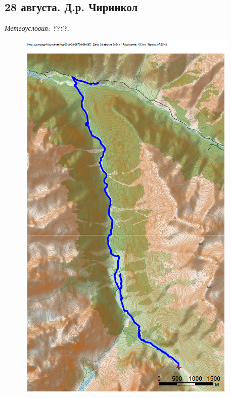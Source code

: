 \subsection{28 августа. Д.р. Чиринкол}
\textit{Метеоусловия: ????.}

\begin{figure}[h!]
	\centering
	\includegraphics[angle=0, width=0.3\linewidth]{../pics/mini_maps/28}
	\label{fig:mini_28}
\end{figure}

\newpage